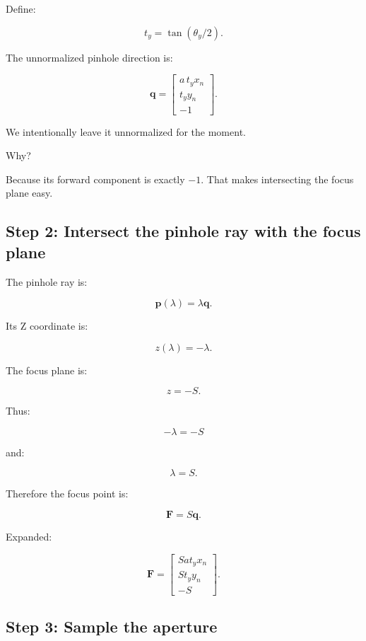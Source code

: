 Define:

\[ t_y=\tan(\theta_y/2). \]

The unnormalized pinhole direction is:

\[ \boxed{ \mathbf q= \begin{bmatrix} a\,t_yx_n\\ t_yy_n\\ -1 \end{bmatrix}. } \]

We intentionally leave it unnormalized for the moment.

Why?

Because its forward component is exactly \(-1\). That makes intersecting the focus plane easy.

\subsection{Step 2: Intersect the pinhole ray with the focus plane}\label{02-foundations-ii-ch036-step-2-intersect-the-pinhole-ray-with-the-focus-plane}

\hypertarget{02-foundations-ii-ch036-step-2-intersect-the-pinhole-ray-with-the-focus-plane}{}

The pinhole ray is:

\[ \mathbf p(\lambda)=\lambda\mathbf q. \]

Its Z coordinate is:

\[ z(\lambda)=-\lambda. \]

The focus plane is:

\[ z=-S. \]

Thus:

\[ -\lambda=-S \]

and:

\[ \lambda=S. \]

Therefore the focus point is:

\[ \boxed{ \mathbf F=S\mathbf q. } \]

Expanded:

\[ \boxed{ \mathbf F= \begin{bmatrix} Sa t_yx_n\\ St_yy_n\\ -S \end{bmatrix}. } \]

\subsection{Step 3: Sample the aperture}\label{02-foundations-ii-ch036-step-3-sample-the-aperture}


